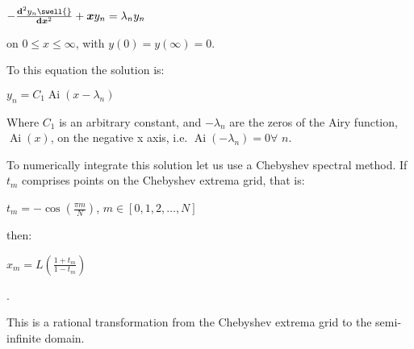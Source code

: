 \documentclass{article}
\newcommand{\tmmathbf}[1]{\ensuremath{\boldsymbol{#1}}}
\newcommand{\tmop}[1]{\ensuremath{\operatorname{#1}}}
\newcommand{\tmtextmd}[1]{{\mdseries{#1}}}
\begin{document}
$- \frac{\mathrm{\ensuremath{\mathbf{d}}}^2 y_n \swell{}}{\mathit{\mathbf{d}}
\text{\tmtextmd{\ensuremath{\tmmathbf{x}}}}^2} +\tmmathbf{x}y_n = \lambda_n
y_n$

on $0 \leqslant x \leqslant \infty$, with $y (0) = y (\infty) = 0$.

To this equation the solution is:

$y_n = C_1 \tmop{Ai} (x - \lambda_n)$

Where $C_1$ is an arbitrary constant, and $- \lambda_n$ are the zeros of the
Airy function, $\tmop{Ai} (x)$, on the negative x axis, i.e. $\tmop{Ai} (-
\lambda_n) = 0$\quad$\forall$ $n$. {}

To numerically integrate this solution let us use a Chebyshev spectral method.
If $t_m$ comprises points on the Chebyshev extrema grid, that is:

$t_m = - \cos \left( \frac{\pi m}{N} \right)$, \qquad$m \in [0, 1, 2, \ldots,
N]$

then:

$x_m = L \left( \frac{1 + t_m}{1 - t_m} \right)$

.

This is a rational transformation from the Chebyshev extrema grid to the
semi-infinite domain.
\end{document}
